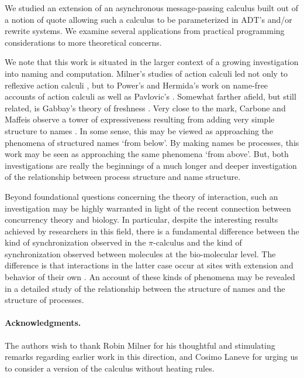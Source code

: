 \documentclass[]{entcs}
\newcommand{\pic}{$\pi$-calculus}
\begin{document}
We studied an extension of an asynchronous message-passing calculus
built out of a notion of quote allowing such a calculus to be
parameterized in ADT's and/or rewrite systems. We examine several
applications from practical programming considerations to more
theoretical concerns.

We note that this work is situated in the larger context of a growing
investigation into naming and computation. Milner's studies of action
calculi led not only to reflexive action calculi
\cite{DBLP:conf/tacs/Milner97}, but to Power's and Hermida's work on
name-free accounts of action calculi
\cite{DBLP:conf/concur/HermidaP95} as well as Pavlovic's \cite{PavlovicD:CLNA}. 
Somewhat farther afield, but still
related, is Gabbay's theory of freshness \cite{GabbayMJ:picfm}. Very
close to the mark, Carbone and Maffeis observe a tower of
expressiveness resulting from adding very simple structure to names
\cite{polysync}. In some sense, this may be viewed as approaching the
phenomena of structured names `from below'. By making names be
processes, this work may be seen as approaching the same phenomena
`from above'. But, both investigations are really the beginnings of a
much longer and deeper investigation of the relationship between
process structure and name structure.

Beyond foundational questions concerning the theory of interaction,
such an investigation may be highly warranted in light of the recent
connection between concurrency theory and biology. In particular,
despite the interesting results achieved by researchers in this field,
there is a fundamental difference between the kind of synchronization
observed in the {\pic} and the kind of synchronization observed
between molecules at the bio-molecular level. The difference is that
interactions in the latter case occur at sites with extension and
behavior of their own \cite{Fontana}. An account of these kinds of
phenomena may be revealed in a detailed study of the relationship
between the structure of names and the structure of processes.

\paragraph{Acknowledgments.}
The authors wish to thank Robin Milner for his thoughtful and
stimulating remarks regarding earlier work in this direction, and
Cosimo Laneve for urging us to consider a version of the calculus
without heating rules.





\end{document}
